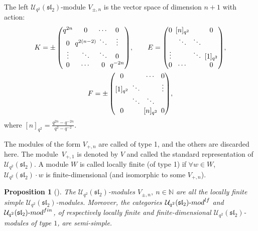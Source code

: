 \documentclass[11pt]{article}
\numberwithin{equation}{section}
\numberwithin{equation}{section}
\newtheorem{Proposition}[Theorem]{Proposition}
 { \theoremstyle{definition}
\newtheorem{Definition}[Theorem]{Definition}
\newtheorem{Note}[Theorem]{Note}
\newtheorem{Example}[Theorem]{Example}
\newtheorem{Remark}[Theorem]{Remark} }
\newcommand{\Uq}{\mathcal{U}_{q^2}(\mathfrak{sl}_2)}
\begin{document}
\begin{Definition}
The left $\Uq$-module $V_{\pm,n}$ is the vector space of dimension $n+1$ with action:
\begin{gather*}
 K=\pm \setlength{\arraycolsep}{1.5pt}\begin{pmatrix}
 q^{2n} & 0& \cdots & 0 \\ 0& q^{2(n-2)} &\ddots &\vdots \\ \vdots &\ddots &\ddots&0 \\ 0 &\cdots&0& q^{-2n}\end{pmatrix}\!,\qquad
 E=\setlength{\arraycolsep}{2.5pt}\begin{pmatrix}
 0 & [n]_{q^2}& & 0 \\ & \ddots &\ddots & \\ \vdots & &\ddots&[1]_{q^2} \\ 0 & \cdots & & 0\end{pmatrix}\!,\\
 F=\setlength{\arraycolsep}{2.5pt}\pm \begin{pmatrix}
 0 & & \cdots & 0 \\ {[1]_{q^2}} & \ddots & & \vdots\\ & \ddots&\ddots& \\ 0 & & [n]_{q^2}& 0\end{pmatrix}\!,
 \end{gather*}
 where $ [n]_{q^2} = \frac{q^{2n}-q^{-2n}}{q^2-q^{-2}}$.

The modules of the form $V_{+,n}$ are called of type 1, and the others are discarded here. The mo\-du\-le~$V_{+,1}$ is denoted by $V$ and called the standard representation of $\Uq$.
A module $W$ is called locally finite (of type 1) if $\forall w \in W$, $\Uq \cdot w$ is finite-dimensional (and isomorphic to some $V_{+,n}$).
\end{Definition}

\begin{Proposition}[{\cite[Theorem~VII.2.2]{Kassel}}]
The $\Uq$-modules $V_{\pm,n},\ n \in \mathbb{N}$ are all the locally finite simple $\Uq$-modules. Moreover, the categories $\Uq\text{-}{\rm mod}^{\rm lf}$ and $\Uq\text{-}{\rm mod}^{\rm fin}$, of respectively locally finite and finite-dimensional $\Uq$-modules of type $1$, are semi-simple.
\end{Proposition}
\end{document}
